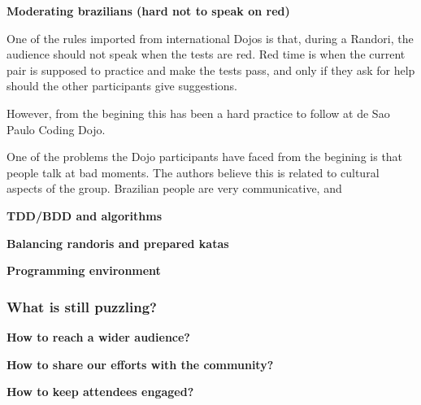 \noindent
\textbf{Moderating brazilians (hard not to speak on red)}

One of the rules imported from international Dojos is that, during a
Randori, the audience should not speak when the tests are red. Red
time is when the current pair is supposed to practice and make the
tests pass, and only if they ask for help should the other
participants give suggestions.

However, from the begining this has been a hard practice to follow at
de Sao Paulo Coding Dojo.

One of the problems the Dojo participants have faced from the begining
is that people talk at bad moments. The authors believe this is
related to cultural aspects of the group. Brazilian people are very
communicative, and 

\noindent
\textbf{TDD/BDD and algorithms}

\noindent
\textbf{Balancing randoris and prepared katas}

\noindent
\textbf{Programming environment}

\subsubsection{What is still puzzling?}\label{ssub:puzzles}

\noindent
\textbf{How to reach a wider audience?}

\noindent
\textbf{How to share our efforts with the community?}

\noindent
\textbf{How to keep attendees engaged?}
